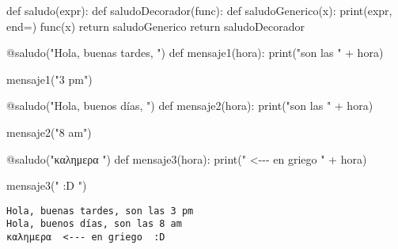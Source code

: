 \documentclass[
  letterpaper,
  DIV=11,
  numbers=noendperiod]{scrreprt}
\newenvironment{Shaded}{\begin{snugshade}}{\end{snugshade}}
\newcommand{\AttributeTok}[1]{\textcolor[rgb]{0.40,0.45,0.13}{#1}}
\newcommand{\BuiltInTok}[1]{\textcolor[rgb]{0.00,0.23,0.31}{#1}}
\newcommand{\ControlFlowTok}[1]{\textcolor[rgb]{0.00,0.23,0.31}{#1}}
\newcommand{\KeywordTok}[1]{\textcolor[rgb]{0.00,0.23,0.31}{#1}}
\newcommand{\NormalTok}[1]{\textcolor[rgb]{0.00,0.23,0.31}{#1}}
\newcommand{\OperatorTok}[1]{\textcolor[rgb]{0.37,0.37,0.37}{#1}}
\newcommand{\StringTok}[1]{\textcolor[rgb]{0.13,0.47,0.30}{#1}}
\begin{document}
\begin{Shaded}
\begin{Highlighting}[]
\KeywordTok{def}\NormalTok{ saludo(expr):}
    \KeywordTok{def}\NormalTok{ saludoDecorador(func):}
        \KeywordTok{def}\NormalTok{ saludoGenerico(x):}
            \BuiltInTok{print}\NormalTok{(expr, end}\OperatorTok{=}\StringTok{\textquotesingle{}\textquotesingle{}}\NormalTok{)}
\NormalTok{            func(x)}
        \ControlFlowTok{return}\NormalTok{ saludoGenerico}
    \ControlFlowTok{return}\NormalTok{ saludoDecorador}

\AttributeTok{@saludo}\NormalTok{(}\StringTok{"Hola, buenas tardes, "}\NormalTok{)}
\KeywordTok{def}\NormalTok{ mensaje1(hora):}
    \BuiltInTok{print}\NormalTok{(}\StringTok{"son las "} \OperatorTok{+}\NormalTok{ hora)}

\NormalTok{mensaje1(}\StringTok{"3 pm"}\NormalTok{)}

\AttributeTok{@saludo}\NormalTok{(}\StringTok{"Hola, buenos días, "}\NormalTok{)}
\KeywordTok{def}\NormalTok{ mensaje2(hora):}
    \BuiltInTok{print}\NormalTok{(}\StringTok{"son las "} \OperatorTok{+}\NormalTok{ hora)}
    
\NormalTok{mensaje2(}\StringTok{"8 am"}\NormalTok{)}

\AttributeTok{@saludo}\NormalTok{(}\StringTok{"καλημερα "}\NormalTok{)}
\KeywordTok{def}\NormalTok{ mensaje3(hora):}
    \BuiltInTok{print}\NormalTok{(}\StringTok{" \textless{}{-}{-}{-} en griego "} \OperatorTok{+}\NormalTok{ hora)}
    
\NormalTok{mensaje3(}\StringTok{" :D "}\NormalTok{)}
\end{Highlighting}
\end{Shaded}

\begin{verbatim}
Hola, buenas tardes, son las 3 pm
Hola, buenos días, son las 8 am
καλημερα  <--- en griego  :D 
\end{verbatim}
\end{document}

